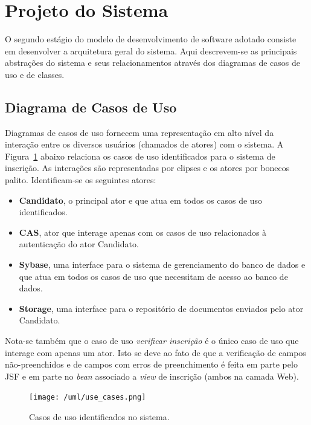 \documentclass[
  10.5pt,				  %
	openright,			%
	twoside,			  %
  a5paper,
  chapter=TITLE,	%
	section=TITLE,	%
  hyphens,        %
	english,        %
	brazil          %
]{abntex2}
\begin{document}
\section{Projeto do Sistema}

O segundo estágio do modelo de desenvolvimento de software adotado consiste em desenvolver a arquitetura geral do sistema. Aqui descrevem-se as principais abstrações do sistema e seus relacionamentos através dos diagramas de casos de uso e de classes.

\subsection{Diagrama de Casos de Uso}\label{sec:casos_uso}

Diagramas de casos de uso fornecem uma representação em alto nível da interação entre os diversos usuários (chamados de atores) com o sistema. A Figura~\ref{fig:use_cases} abaixo relaciona os casos de uso identificados para o sistema de inscrição. As interações são representadas por elipses e os atores por bonecos palito. Identificam-se os seguintes atores:

\begin{itemize}
  \item \textbf{Candidato}, o principal ator e que atua em todos os casos de uso identificados.
  \item \textbf{CAS}, ator que interage apenas com os casos de uso relacionados à autenticação do ator Candidato.
  \item \textbf{Sybase}, uma interface para o sistema de gerenciamento do banco de dados e que atua em todos os casos de uso que necessitam de acesso ao banco de dados.
  \item \textbf{Storage}, uma interface para o repositório de documentos enviados pelo ator Candidato.
\end{itemize}

Nota-se também que o caso de uso \emph{verificar inscrição} é o único caso de uso que interage com apenas um ator. Isto se deve ao fato de que a verificação de campos não-preenchidos e de campos com erros de preenchimento é feita em parte pelo JSF e em parte no \emph{bean} associado a \emph{view} de inscrição (ambos na camada Web).

\begin{figure}[!ht]
  \caption{\label{fig:use_cases} Casos de uso identificados no sistema.}
  \begin{center}
    \texttt{[image: /uml/use\_cases.png]}
  \end{center}
\end{figure}
\end{document}
